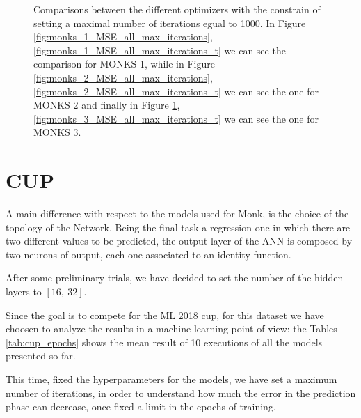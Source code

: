 \begin{figure}[t!]
\begin{subfigure}{0.45\textwidth}
{                    }
                    \caption{}
                    \label{fig:monks_3_MSE_all_max_iterations}
                \end{subfigure}
                \caption{Comparisons between the different optimizers with the constrain of setting a
                maximal number of iterations egual to 1000. In Figure \ref{fig:monks_1_MSE_all_max_iterations}, \ref{fig:monks_1_MSE_all_max_iterations_t}
                we can see the comparison for MONKS 1, while in Figure \ref{fig:monks_2_MSE_all_max_iterations}, \ref{fig:monks_2_MSE_all_max_iterations_t}
                we can see the one for MONKS 2 and finally in Figure \ref{fig:monks_3_MSE_all_max_iterations}, \ref{fig:monks_3_MSE_all_max_iterations_t} we
                can see the one for MONKS 3.}
                \label{fig:monks_MSE_all_max_iterations}
            \end{figure}


    \section{CUP} %
        \label{sec:cup}

        A main difference with respect to the models used for Monk, is the choice of the topology of the Network.
        Being the final task a regression one in which there are two different values to be predicted, the output layer of the ANN is composed by two neurons of output, each one associated to an identity function.

        After some preliminary trials, we have decided to set the number of the hidden layers to $[16,\ 32]$.

        Since the goal is to compete for the ML 2018 cup, for this dataset we have choosen to analyze the results in a machine learning point of view: the Tables \ref{tab:cup_epochs} shows the mean result of 10 executions of all the models presented so far.

        This time, fixed the hyperparameters for the models, we have set a maximum number of iterations, in order to understand how much the error in the prediction phase can decrease, once fixed a limit in the epochs of training. 


